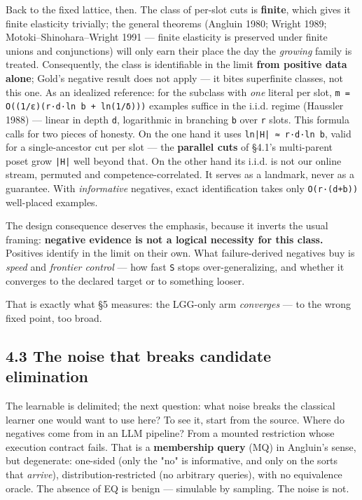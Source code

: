 \documentclass[11pt]{article}
\begin{document}
Back to the fixed lattice, then. The class of per-slot cuts is \textbf{finite}, which gives it finite elasticity trivially; the general theorems (Angluin 1980; Wright 1989; Motoki–Shinohara–Wright 1991 — finite elasticity is preserved under finite unions and conjunctions) will only earn their place the day the \emph{growing} family is treated. Consequently, the class is identifiable in the limit \textbf{from positive data alone}; Gold's negative result does not apply — it bites superfinite classes, not this one. As an idealized reference: for the subclass with \emph{one} literal per slot, \texttt{m = O((1/\allowbreak{}ε)(r·d·ln b + ln(1/\allowbreak{}δ)))} examples suffice in the i.i.d. regime (Haussler 1988) — linear in depth \texttt{d}, logarithmic in branching \texttt{b} over \texttt{r} slots. This formula calls for two pieces of honesty. On the one hand it uses \texttt{ln|H| ≈ r·d·ln b}, valid for a single-ancestor cut per slot — the \textbf{parallel cuts} of §4.1's multi-parent poset grow \texttt{|H|} well beyond that. On the other hand its i.i.d. is not our online stream, permuted and competence-correlated. It serves as a landmark, never as a guarantee. With \emph{informative} negatives, exact identification takes only \texttt{O(r·(d+b))} well-placed examples.

The design consequence deserves the emphasis, because it inverts the usual framing: \textbf{negative evidence is not a logical necessity for this class.} Positives identify in the limit on their own. What failure-derived negatives buy is \emph{speed} and \emph{frontier control} — how fast \texttt{S} stops over-generalizing, and whether it converges to the declared target or to something looser.

That is exactly what §5 measures: the LGG-only arm \emph{converges} — to the wrong fixed point, too broad.

\subsection*{4.3 The noise that breaks candidate elimination}

The learnable is delimited; the next question: what noise breaks the classical learner one would want to use here? To see it, start from the source. Where do negatives come from in an LLM pipeline? From a mounted restriction whose execution contract fails. That is a \textbf{membership query} (MQ) in Angluin's sense, but degenerate: one-sided (only the "no" is informative, and only on the sorts that \emph{arrive}), distribution-restricted (no arbitrary queries), with no equivalence oracle. The absence of EQ is benign — simulable by sampling. The noise is not.
\end{document}
